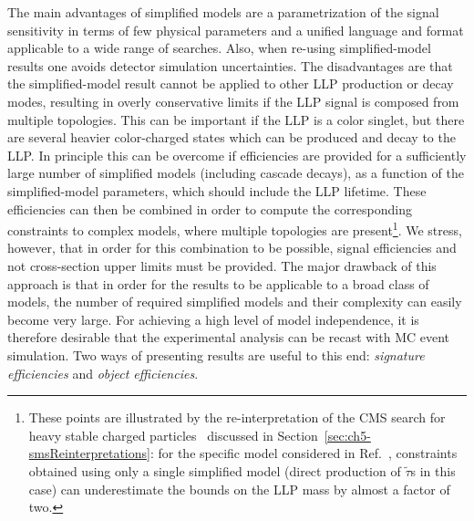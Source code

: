 The main advantages of simplified models are a parametrization of the signal sensitivity in terms of few
physical parameters and a unified language and format applicable to a wide range of searches.
Also, when re-using simplified-model results one avoids detector simulation uncertainties. 
The disadvantages are that the simplified-model result  
cannot be applied to other LLP production or decay modes, resulting
in overly conservative limits if the LLP signal is composed from
multiple topologies. This can be important if 
the LLP is a color singlet, but there are several heavier color-charged states
which can be produced and decay to the LLP.
In principle this can be overcome if efficiencies are provided for a
sufficiently large number of simplified models (including cascade decays), as a
function of the simplified-model parameters, which should include the LLP lifetime.
These efficiencies can then be combined in order to compute the corresponding
constraints to complex models, where multiple topologies are present\footnote{These points are illustrated by the re-interpretation of the CMS search
for heavy stable charged particles~\cite{Khachatryan:2015lla}
discussed in Section~\ref{sec:ch5-smsReinterpretations}: 
for the specific model considered in Ref.~\cite{Heisig:2015yla},
constraints obtained using only a single simplified model (direct production of
$\tilde{\tau}$s in this case) can underestimate the bounds on the LLP mass by almost a factor of two.}.
We stress, however, that in order for this combination to be possible, signal efficiencies and 
not cross-section upper limits must be provided.
The major drawback of this approach is that in order for the results to be
applicable to a broad class of models, the number of required simplified models
and their complexity can easily become very large.
For achieving a high level of model independence, it is therefore desirable 
that the experimental analysis can be recast with MC event simulation. 
Two ways of presenting results are useful to this end: {\it signature
efficiencies} and {\it object efficiencies}. 





  
